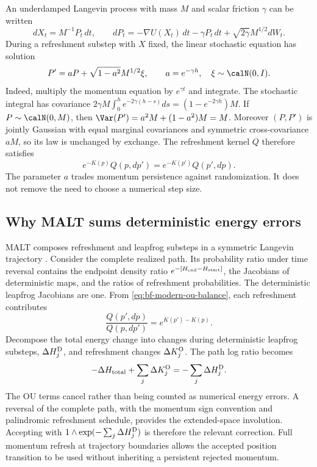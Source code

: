 An underdamped Langevin process with mass $M$ and scalar friction $\gamma$
can be written
\begin{equation}
 dX_t=M^{-1}P_t\,dt,\qquad
 dP_t=-\nabla U(X_t)\,dt-\gamma P_t\,dt
          +\sqrt{2\gamma}M^{1/2}dW_t.
 \label{eq:bf-modern-langevin}
\end{equation}
During a refreshment substep with $X$ fixed, the linear stochastic equation
has solution
\begin{equation}
 P'=aP+\sqrt{1-a^2}M^{1/2}\xi,\qquad
 a=e^{-\gamma h},\quad\xi\sim\calN(0,I).
 \label{eq:bf-modern-ou}
\end{equation}
Indeed, multiply the momentum equation by $e^{\gamma t}$ and integrate.
The stochastic integral has covariance
$2\gamma M\int_0^h e^{-2\gamma(h-s)}ds=(1-e^{-2\gamma h})M$.
If $P\sim\calN(0,M)$, then $\Var(P')=a^2M+(1-a^2)M=M$. Moreover
$(P,P')$ is jointly Gaussian with equal marginal covariances and symmetric
cross-covariance $aM$, so its law is unchanged by exchange. The refreshment
kernel $Q$ therefore satisfies
\begin{equation}
 e^{-K(p)}Q(p,dp')=e^{-K(p')}Q(p',dp).
 \label{eq:bf-modern-ou-balance}
\end{equation}
The parameter $a$ trades momentum persistence against randomization. It does
not remove the need to choose a numerical step size.

\subsection{Why MALT sums deterministic energy errors}

MALT composes refreshment and leapfrog substeps in a symmetric Langevin
trajectory \citep[Sections 2--3]{rioudurand2023malt}. Consider the complete
realized path. Its probability ratio under time reversal contains the
endpoint density ratio $e^{-[H_{\rm end}-H_{\rm start}]}$, the Jacobians
of deterministic maps, and the ratios of refreshment probabilities. The
deterministic leapfrog Jacobians are one. From
\eqref{eq:bf-modern-ou-balance}, each refreshment contributes
\begin{equation}
 \frac{Q(p',dp)}{Q(p,dp')}=e^{K(p')-K(p)}.
 \label{eq:bf-modern-refresh-ratio}
\end{equation}
Decompose the total energy change into changes during deterministic
leapfrog substeps, $\Delta H_j^{\rm D}$, and refreshment changes
$\Delta K_j^{\rm O}$. The path log ratio becomes
\begin{equation}
 -\Delta H_{\rm total}+\sum_j\Delta K_j^{\rm O}
       =-\sum_j\Delta H_j^{\rm D}.
 \label{eq:bf-modern-malt-path-ratio}
\end{equation}
The OU terms cancel rather than being counted as numerical energy errors.
A reversal of the complete path, with the momentum sign convention and
palindromic refreshment schedule, provides the extended-space involution.
Accepting with $1\wedge\exp(-\sum_j\Delta H_j^{\rm D})$ is therefore
the relevant correction. Full momentum refresh at trajectory boundaries
allows the accepted position transition to be used without inheriting a
persistent rejected momentum.

